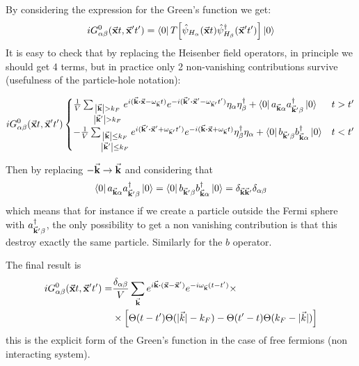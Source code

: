\documentclass[../main/main.tex]{subfiles}
\begin{document}
By considering the expression for the Green's function we get:
\begin{equation*}
  i G_{\alpha \beta }^0 (\va{x}t,\va{x}'t')
  = \bra{0} T \qty[\hat{\psi }_{H_\alpha } (\va{x}t) \hat{\psi }_{H_ \beta } ^\dag (\va{x}'t')  ] \ket{0}
\end{equation*}
It is easy to check that by replacing the Heisenber field operators, in principle we should get 4 terms, but in practice only 2 non-vanishing contributions survive (usefulness of the particle-hole notation):
\begin{small}
\begin{equation*}
i G_{\alpha \beta }^0 (\va{x}t,\va{x}'t')
  \begin{cases}
   \frac{1}{V} \sum_{\substack{\abs{\va{k}}> k_F  \\ \abs{\va{k}'}> k_F} }^{}
   e^{i (\va{k}\vdot \va{x}- \omega _{\va{k}} t)}
   e^{-i (\va{k}'\vdot \va{x}'- \omega _{\va{k}'}t')} \eta _ \alpha  \eta _ \beta ^\dag   + \bra{0} a_{\va{k}\alpha } a_{\va{k}'\beta }^\dag  \ket{0} & t> t' \\
   -\frac{1}{V} \sum_{\substack{\abs{\va{k}} \le k_F  \\ \abs{\va{k}'}\le k_F} }^{}
   e^{i (\va{k}'\vdot \va{x}'+ \omega _{\va{k}'} t')}
   e^{-i (\va{k}\vdot \va{x}+ \omega _{\va{k}}t)} \eta _ \beta ^\dag   \eta _ \alpha   + \bra{0} b_{\va{k}'\beta } b_{\va{k}\alpha  }^\dag  \ket{0} & t< t'
  \end{cases}
\end{equation*}
\end{small}
Then by replacing \( -\va{k} \rightarrow \va{k} \) and considering that
\begin{equation*}
  \bra{0}  a_{\va{k}\alpha } a_{\va{k}'\beta }^\dag \ket{0}
  = \bra{0}   b_{\va{k}'\beta } b_{\va{k}\alpha  }^\dag \ket{0}
  = \delta_ {\va{k}\va{k}'} \delta _{\alpha \beta }
\end{equation*}
which means that for instance if we create a particle outside the Fermi sphere with \(  a_{\va{k}'\beta }^\dag \), the only possibility to get a non vanishing contribution is that this destroy exactly the same particle. Similarly for the \( b \) operator.

The final result is
\begin{equation}
  \begin{split}
  i G_{\alpha \beta }^0 (\va{x}t,\va{x}'t')
  =& \frac{\delta _{\alpha \beta }}{V}
  \sum_{\va{k}}^{} e^{i \va{k}\vdot (\va{x}-\va{x}')}
  e^{-i \omega _{\va{k}} (t-t')} \times \\
  & \times \qty[ \Theta (t-t') \Theta (\absvec{k} -k_F) - \Theta (t'-t) \Theta (k_F- \absvec{k} )]
    \end{split}
    \label{eq:8_2} 
\end{equation}
this is the explicit form of the Green's function in the case of free fermions (non interacting system).
\end{document}
